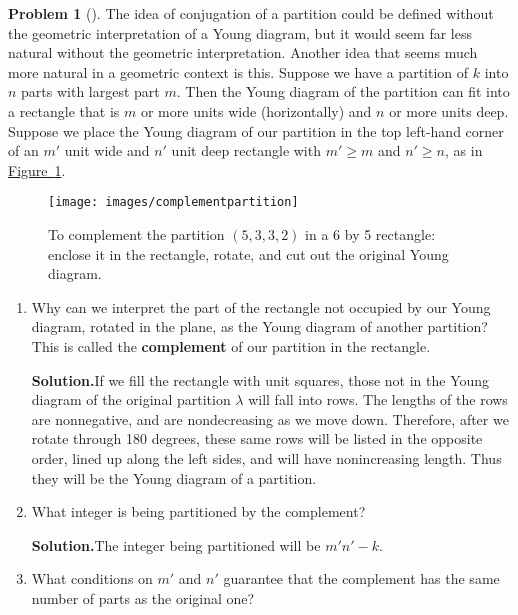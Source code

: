 \documentclass[10pt,]{book}
\newcommand{\terminology}[1]{\textbf{#1}}
\theoremstyle{plain}
\theoremstyle{definition}
\newtheorem{activity}[project]{Problem}
\theoremstyle{definition}
\numberwithin{equation}{chapter}
\begin{document}
\begin{activity}[]\label{activity-168}
The idea of conjugation of a partition could be defined without the geometric interpretation of a Young diagram, but it would seem far less natural without the geometric interpretation. Another idea that seems much more natural in a geometric context is this. Suppose we have a partition of \(k\) into \(n\) parts with largest part \(m\). Then the Young diagram of the partition can fit into a rectangle that is \(m\) or more units wide (horizontally) and \(n\) or more units deep. Suppose we place the Young diagram of our partition in the top left-hand corner of an \(m'\) unit wide and \(n'\) unit deep rectangle with \(m'\ge m\) and \(n' \ge n\), as in \hyperref[complementpartition]{Figure~\ref{complementpartition}}.%
\begin{figure}
\centering
\texttt{[image: images/complementpartition]}
\caption{To complement the partition \((5,3,3,2)\) in a 6 by 5 rectangle: enclose it in the rectangle, rotate, and cut out the original Young diagram.\label{complementpartition}}
\end{figure}
\begin{enumerate}[font=\bfseries,label=(\alph*),ref=\alph*]
\item\label{task-113} Why can we interpret the part of the rectangle not occupied by our Young diagram, rotated in the plane, as the Young diagram of another partition? This is called the \terminology{complement} of our partition in the rectangle.%
\par\medskip\noindent%
\textbf{Solution.}\quad If we fill the rectangle with unit squares, those not in the Young diagram of the original partition \(\lambda\) will fall into rows.  The lengths of the rows are nonnegative, and are nondecreasing as we move down. Therefore, after we rotate through 180 degrees, these same rows will be listed in the opposite order, lined up along the left sides, and will have nonincreasing length. Thus they will be the Young diagram of a partition.%
\item\label{task-114} What integer is being partitioned by the complement?%
\par\medskip\noindent%
\textbf{Solution.}\quad The integer being partitioned will be \(m'n'-k\).%
\item\label{task-115} What conditions on \(m'\) and \(n'\) guarantee that the complement has the same number of parts as the original one?%
\par\medskip\noindent%

\end{enumerate}
\end{activity}
\end{document}
